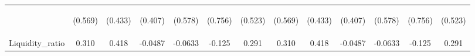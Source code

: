 \documentclass[]{article}
\begin{document}
\begin{center}
\begin{tabular}{lcccccccccccc}
\vspace{4pt} & \begin{footnotesize}(0.569)\end{footnotesize} & \begin{footnotesize}(0.433)\end{footnotesize} & \begin{footnotesize}(0.407)\end{footnotesize} & \begin{footnotesize}(0.578)\end{footnotesize} & \begin{footnotesize}(0.756)\end{footnotesize} & \begin{footnotesize}(0.523)\end{footnotesize} & \begin{footnotesize}(0.569)\end{footnotesize} & \begin{footnotesize}(0.433)\end{footnotesize} & \begin{footnotesize}(0.407)\end{footnotesize} & \begin{footnotesize}(0.578)\end{footnotesize} & \begin{footnotesize}(0.756)\end{footnotesize} & \begin{footnotesize}(0.523)\end{footnotesize} \\
Liquidity\_ratio & 0.310 & 0.418 & -0.0487 & -0.0633 & -0.125 & 0.291 & 0.310 & 0.418 & -0.0487 & -0.0633 & -0.125 & 0.291 \\

\end{tabular}
\end{center}
\end{document}
